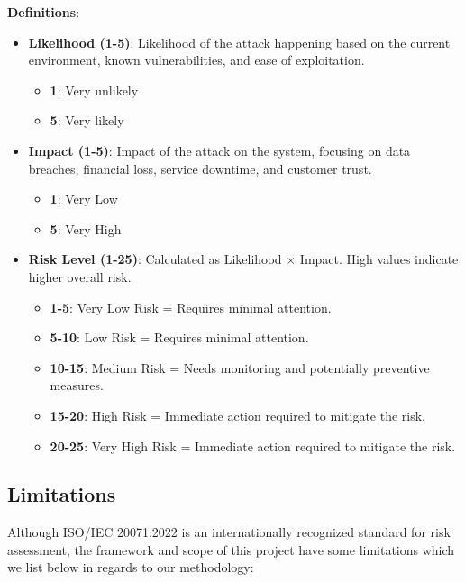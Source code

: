 \newpage
\textbf{Definitions}:
    \begin{itemize}
        \item  \textbf{Likelihood (1-5)}: Likelihood of the attack happening based on the current environment, known vulnerabilities, and ease of exploitation.          \begin{itemize}
            \item \textbf{1}: Very unlikely
            \item \textbf{5}: Very likely
         \end{itemize}
        \item \textbf{Impact (1-5)}: Impact of the attack on the system, focusing on data breaches, financial loss, service downtime, and customer trust.
         \begin{itemize}
            \item \textbf{1}: Very Low
            \item \textbf{5}: Very High
         \end{itemize}
         
       \item  \textbf{Risk Level (1-25)}: Calculated as Likelihood × Impact. High values indicate higher overall risk. 
       \begin{itemize}
           \item \textbf{1-5}: Very Low Risk = Requires minimal attention.
           \item \textbf{5-10}: Low Risk = Requires minimal attention.
           \item \textbf{10-15}: Medium Risk = Needs monitoring and potentially preventive measures.
           \item \textbf{15-20}: High Risk = Immediate action required to mitigate the risk.
           \item \textbf{20-25}: Very High Risk = Immediate action required to mitigate the risk.

       \end{itemize}
    \end{itemize}

    
\subsection{Limitations}  
Although ISO/IEC 20071:2022 is an internationally recognized standard for risk assessment, the framework and scope of this project have some limitations which we list below in regards to our methodology:

